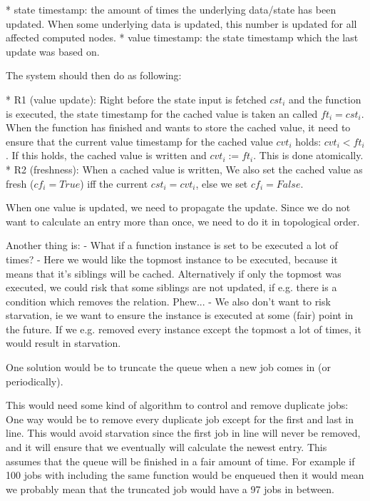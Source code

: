 * state timestamp: the amount of times the underlying data/state has been
  updated. When some underlying data is updated, this number is updated for
  all affected computed nodes.
* value timestamp: the state timestamp which the last update was based on.

The system should then do as following:

* R1 (value update): Right before the state input is fetched $cst_i$ and the function is executed,
  the state timestamp for the cached value is taken an called $ft_i = cst_i$. When the function
  has finished and wants to store the cached value, it need to ensure that
  the current value timestamp for the cached value $cvt_i$ holds: $cvt_i < ft_i$.
  If this holds, the cached value is written and $cvt_i := ft_i$. This is done
  atomically.
* R2 (freshness): When a cached value is written, We also set the cached value as fresh
  ($cf_i = True$) iff the current $cst_i = cvt_i$, else we set $cf_i = False$.



When one value is updated, we need to propagate the update. Since we do not
want to calculate an entry more than once, we need to do it in topological
order.

Another thing is:
- What if a function instance is set to be executed a lot of times?
  - Here we would like the topmost instance to be executed, because it
    means that it's siblings will be cached. Alternatively if only the
    topmost was executed, we could risk that some siblings are not updated,
    if e.g. there is a condition which removes the relation. Phew...
  - We also don't want to risk starvation, ie we want to ensure the instance
    is executed at some (fair) point in the future. If we e.g. removed every
    instance except the topmost a lot of times, it would result in starvation.


One solution would be to truncate the queue when a new job comes in (or periodically).

This would need some kind of algorithm to control and remove duplicate jobs:
One way would be to remove every duplicate job except for the first and last in line.
This would avoid starvation since the first job in line will never be removed, and
it will ensure that we eventually will calculate the newest entry. This assumes
that the queue will be finished in a fair amount of time. For example if 100
jobs with including the same function would be enqueued then it would mean we probably
mean that the truncated job would have a 97 jobs in between.





